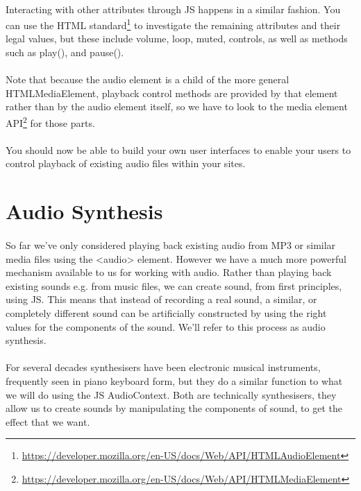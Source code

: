 \paragraph{} Interacting with other attributes through JS happens in a similar fashion. You can use the HTML standard\footnote{\url{https://developer.mozilla.org/en-US/docs/Web/API/HTMLAudioElement}} to investigate the remaining attributes and their legal values, but these include volume, loop, muted, controls, as well as methods such as play(), and pause().
\paragraph{} Note that because the audio element is a child of the more general HTMLMediaElement, playback control methods are provided by that element rather than by the audio element itself, so we have to look to the media element API\footnote{\url{https://developer.mozilla.org/en-US/docs/Web/API/HTMLMediaElement}} for those parts.
\paragraph{} You should now be able to build your own user interfaces to enable your users to control playback of existing audio files within your sites.


\section{Audio Synthesis}
\paragraph{} So far we've only considered playing back existing audio from MP3 or similar media files using the <audio> element. However we have a much more powerful mechanism available to us for working with audio. Rather than playing back existing sounds e.g. from music files, we can create sound, from first principles, using JS. This means that instead of recording a real sound, a similar, or completely different sound can be artificially constructed by using the right values for the components of the sound. We'll refer to this process as audio synthesis.
\paragraph{} For several decades synthesisers have been electronic musical instruments, frequently seen in piano keyboard form, but they do a similar function to what we will do using the JS AudioContext. Both are technically synthesisers, they allow us to create sounds by manipulating the components of sound, to get the effect that we want.
